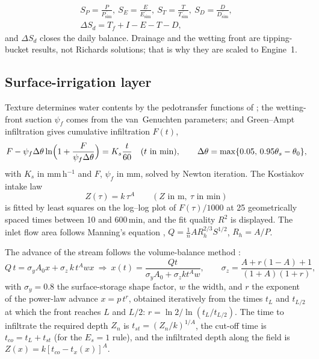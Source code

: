 \begin{equation}
\begin{gathered}S_P=\frac{P}{\overline{P_{\mathrm{sim}}}},\ S_E=\frac{E}{\overline{E_{\mathrm{sim}}}},\ S_T=\frac{T}{\overline{T_{\mathrm{sim}}}},\ S_D=\frac{D}{\overline{D_{\mathrm{sim}}}},\\ \Delta S_d=T_f+I-E-T-D,\end{gathered}
\label{eq:scale}
\end{equation}
and $\Delta S_d$ closes the daily balance. Drainage and the wetting front are tipping-bucket results, not Richards solutions; that is why they are scaled to Engine~1.

\subsection{Surface-irrigation layer}
\label{sec:surf}
Texture determines water contents by the pedotransfer functions of \citet{Saxton2006}; the wetting-front suction $\psi_f$ comes from the van~Genuchten parameters; and Green--Ampt infiltration \citep{GreenAmpt1911} gives cumulative infiltration $F(t)$,
\begin{equation}
F-\psi_f\Delta\theta\ln\Bigl(1+\frac{F}{\psi_f\Delta\theta}\Bigr)=K_s\frac{t}{60}\quad(t\text{ in min}),\qquad \Delta\theta=\max\{0.05,\,0.95\theta_s-\theta_0\},
\label{eq:GA}
\end{equation}
with $K_s$ in mm\,h$^{-1}$ and $F$, $\psi_f$ in mm, solved by Newton iteration. The Kostiakov intake law \citep{Kostiakov1932}
\begin{equation}
Z(\tau)=k\,\tau^{A}\qquad(Z\text{ in m},\ \tau\text{ in min})
\label{eq:kost}
\end{equation}
is fitted by least squares on the log--log plot of $F(\tau)/1000$ at 25 geometrically spaced times between 10 and 600\,min, and the fit quality $R^2$ is displayed. The inlet flow area follows Manning's equation \citep{Manning1891}, $Q=\frac1n AR_h^{2/3}S^{1/2}$, $R_h=A/P$.

The advance of the stream follows the volume-balance method \citep{Walker1987,Elliott1982}:
\begin{equation}
Q\,t=\sigma_y A_0x+\sigma_z\,k\,t^{A}wx\ \Longrightarrow\ x(t)=\frac{Qt}{\sigma_yA_0+\sigma_zkt^{A}w},\qquad \sigma_z=\frac{A+r(1-A)+1}{(1+A)(1+r)},
\label{eq:vb}
\end{equation}
with $\sigma_y=0.8$ the surface-storage shape factor, $w$ the width, and $r$ the exponent of the power-law advance $x=p\,t^{r}$, obtained iteratively from the times $t_L$ and $t_{L/2}$ at which the front reaches $L$ and $L/2$: $r=\ln2/\ln(t_L/t_{L/2})$. The time to infiltrate the required depth $Z_n$ is $t_{st}=(Z_n/k)^{1/A}$, the cut-off time is $t_{co}=t_L+t_{st}$ (for the $E_s=1$ rule), and the infiltrated depth along the field is $Z(x)=k[t_{co}-t_x(x)]^{A}$.


